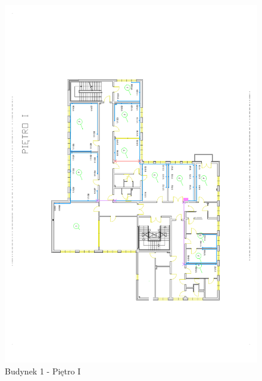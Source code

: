\begin{figure}[H]
  \begin{center}
    \includegraphics[width=\textwidth]{img/s/b1-1.pdf}
    \caption{Budynek 1 - Piętro I}
  \end{center}
\end{figure}

